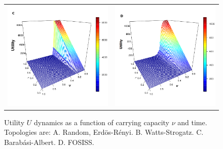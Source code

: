 \documentclass[11pt]{article}
\begin{document}
\begin{figure} [h!]
\begin{tabular}{cc}
\includegraphics[scale=0.28]{images/barabasi_fitness_nus_1.png} & \includegraphics[scale=0.28]{images/fosiss_fitness_nus_1.png}
\end{tabular}
\caption{Utility $U$ dynamics as a function of carrying capacity $\nu$ and time. Topologies are: A. Random, Erd\"{o}s-R\'enyi. B. Watts-Strogatz. C. Barab\'asi-Albert. D. FOSISS.}\label{fitness}
\end{figure}
\end{document}
